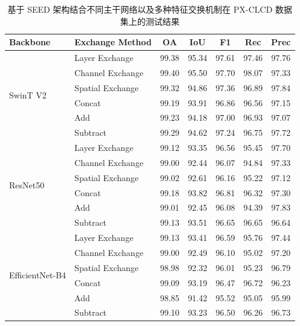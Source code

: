 \begin{table}[!htbp]
\centering
\caption{基于 SEED 架构结合不同主干网络以及多种特征交换机制在 PX-CLCD 数据集上的测试结果}
\label{tab:seed_pxclcd_backbone}
\begin{tabular}{l l c c c c c}
\hline
\textbf{Backbone} & \textbf{Exchange Method} & \textbf{OA} & \textbf{IoU} & \textbf{F1} & \textbf{Rec} & \textbf{Prec} \\
\hline
\multirow{6}{*}{SwinT V2} 
 & Layer Exchange    & 99.38 & 95.34 & 97.61 & 97.46 & 97.76 \\
 & Channel Exchange  & 99.40 & 95.50 & 97.70 & 98.07 & 97.33 \\
 & Spatial Exchange  & 99.32 & 94.86 & 97.36 & 96.89 & 97.84 \\
\cline{2-7}
 & Concat            & 99.19 & 93.91 & 96.86 & 96.56 & 97.15 \\
 & Add               & 99.23 & 94.18 & 97.00 & 96.93 & 97.07 \\
 & Subtract             & 99.29 & 94.62 & 97.24 & 96.75 & 97.72 \\
\hline
\multirow{6}{*}{ResNet50} 
 & Layer Exchange    & 99.12 & 93.35 & 96.56 & 95.45 & 97.70 \\
 & Channel Exchange  & 99.00 & 92.44 & 96.07 & 94.84 & 97.33 \\
 & Spatial Exchange  & 99.02 & 92.61 & 96.16 & 95.22 & 97.12 \\
\cline{2-7}
 & Concat            & 99.18 & 93.82 & 96.81 & 96.32 & 97.30 \\
 & Add               & 99.01 & 92.45 & 96.08 & 94.39 & 97.83 \\ 
 & Subtract             & 99.13 & 93.51 & 96.65 & 96.65 & 96.64 \\
\hline
\multirow{6}{*}{EfficientNet-B4} 
 & Layer Exchange    & 99.13	& 93.41	& 96.59	& 95.76	& 97.44 \\
 & Channel Exchange  & 99.00 & 92.49 & 96.10 & 95.02 & 97.20 \\
 & Spatial Exchange  & 98.98	& 92.32	& 96.01	& 95.23	& 96.79 \\
\cline{2-7}
 & Concat            & 99.09	& 93.19	& 96.47	& 96.72	& 96.23 \\
 & Add               & 98.85 & 91.42 & 95.52 & 95.05 & 95.99 \\
 & Subtract          & 99.10	& 93.23	& 96.50	& 96.26	& 96.73 \\

\hline
\end{tabular}
\end{table}

